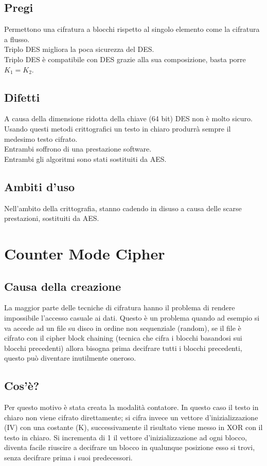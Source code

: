 \subsection{Pregi}
Permettono una cifratura a blocchi rispetto al singolo elemento come la cifratura a flusso.\\
Triplo DES migliora la poca sicurezza del DES.\\
Triplo DES è compatibile con DES grazie alla sua composizione, basta porre $K_1=K_2$.

\subsection{Difetti}
A causa della dimensione ridotta della chiave (64 bit) DES non è molto sicuro.\\
Usando questi metodi crittografici un testo in chiaro produrrà sempre il medesimo testo cifrato.\\
Entrambi soffrono di una prestazione software.\\
Entrambi gli algoritmi sono stati sostituiti da AES.

\subsection{Ambiti d'uso}
Nell'ambito della crittografia, stanno cadendo in disuso a causa delle scarse prestazioni, sostituiti da AES.

\section{Counter Mode Cipher}
\subsection{Causa della creazione}
La maggior parte delle tecniche di cifratura hanno il problema di rendere impossibile l'accesso casuale ai dati. Questo è un problema quando ad esempio si va accede ad un file su disco in ordine non sequenziale (random), se il file è cifrato con il cipher block chaining (tecnica che cifra i blocchi basandosi sui blocchi precedenti) allora bisogna prima decifrare tutti i blocchi precedenti, questo può diventare inutilmente oneroso.
\subsection{Cos'è?}
Per questo motivo è stata creata la modalità contatore. In questo caso il testo in chiaro non viene cifrato direttamente; si cifra invece un vettore d'inizializzazione (IV) con una costante (K), successivamente il risultato viene messo in XOR con il testo in chiaro. Si incrementa di 1 il vettore d'inizializzazione ad ogni blocco, diventa facile riuscire a decifrare un blocco in qualunque posizione esso si trovi, senza decifrare prima i suoi predecessori.

